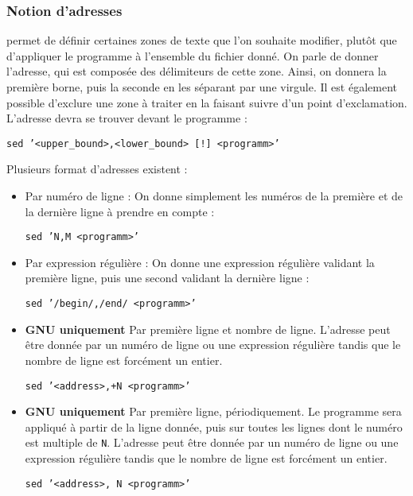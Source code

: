 \subsubsection{Notion d'adresses}

 permet de définir certaines zones de texte que l'on souhaite modifier, plutôt que d'appliquer le programme à l'ensemble du fichier donné. On parle de donner l'adresse, qui est composée des délimiteurs de cette zone. Ainsi, on donnera la première borne, puis la seconde en les séparant par une virgule. Il est également possible d'exclure une zone à traiter en la faisant suivre d'un point d'exclamation. L'adresse devra se trouver devant le programme  : 
\begin{nscenter}
\texttt{sed '<upper_bound>,<lower_bound> [!] <programm>'}
\end{nscenter}

Plusieurs format d'adresses existent : 
\begin{itemize}
    \item Par numéro de ligne : On donne simplement les numéros de la première et de la dernière ligne à prendre en compte : 
        \begin{nscenter}
            \texttt{sed 'N,M <programm>'}
        \end{nscenter}
    \item Par expression régulière : On donne une expression régulière validant la première ligne, puis une second validant la dernière ligne :
        \begin{nscenter}
            \texttt{sed '/begin/,/end/ <programm>'}
        \end{nscenter}
    \item \textbf{GNU  uniquement} Par première ligne et nombre de ligne. L'adresse peut être donnée par un numéro de ligne ou une expression régulière tandis que le nombre de ligne est forcément un entier.
        \begin{nscenter}
            \texttt{sed '<address>,+N <programm>'}
        \end{nscenter}
    \item \textbf{GNU  uniquement} Par première ligne, périodiquement.  Le programme sera appliqué à partir de la ligne donnée, puis sur toutes les lignes dont le numéro est multiple de \texttt{N}. L'adresse peut être donnée par un numéro de ligne ou une expression régulière tandis que le nombre de ligne est forcément un entier.
        \begin{nscenter}
            \texttt{sed '<address>,~N <programm>'}
        \end{nscenter}
\end{itemize}

